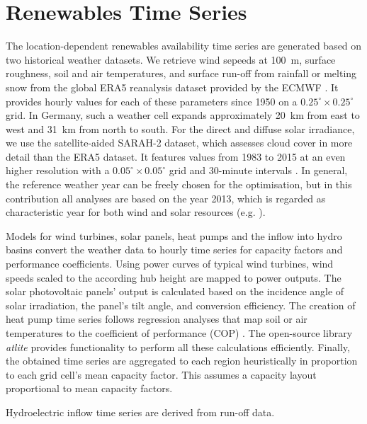
\section{Renewables Time Series}

The location-dependent renewables availability time series are generated based
on two historical weather datasets. We retrieve wind sepeeds at
\SI{100}{\metre}, surface roughness, soil and air temperatures, and surface
run-off from rainfall or melting snow from the global ERA5 reanalysis dataset
provided by the ECMWF \citeS{}. It provides hourly values for each of these
parameters since 1950 on a $0.25^{\circ} \times 0.25^{\circ}$ grid. In Germany,
such a weather cell expands approximately \SI{20}{\kilo\metre} from east to west
and \SI{31}{km} from north to south. For the direct and diffuse solar
irradiance, we use the satellite-aided SARAH-2 dataset, which assesses cloud
cover in more detail than the ERA5 dataset. It features values from 1983 to 2015
at an even higher resolution with a $0.05^{\circ} \times 0.05^{\circ}$ grid and
30-minute intervals \citeS{}. In general, the reference weather year can be
freely chosen for the optimisation, but in this contribution all analyses are
based on the year 2013, which is regarded as characteristic year for both wind
and solar resources (e.g. \citeS{}).

Models for wind turbines, solar panels, heat pumps and the inflow into hydro
basins convert the weather data to hourly time series for capacity factors and
performance coefficients. Using power curves of typical wind turbines, wind speeds scaled to the according hub
height are mapped to power outputs. The solar photovoltaic panels' output is
calculated based on the incidence angle of solar irradiation, the panel's tilt
angle, and conversion efficiency. The creation of heat pump time series follows
regression analyses that map soil or air temperatures to the coefficient of
performance (COP) .
The open-source library \textit{atlite} \citeS{} provides functionality to
perform all these calculations efficiently. Finally, the obtained time series
are aggregated to each region heuristically in proportion to each grid cell's
mean capacity factor. This assumes a capacity layout proportional to mean
capacity factors.

Hydroelectric inflow time series are derived from run-off data.

